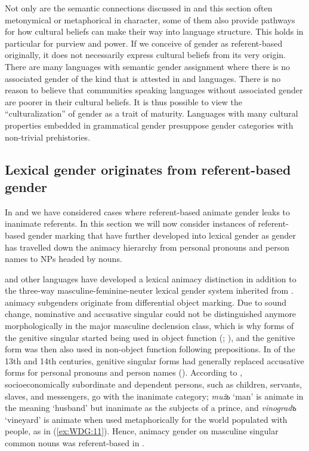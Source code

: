 \documentclass[output=collectionpaper]{langsci/langscibook}
\begin{document}
Not only are the semantic connections discussed in  and this section often metonymical or metaphorical in character, some of them also provide pathways for how cultural beliefs can make their way into language structure. This holds in particular for purview and power. If we conceive of gender as referent-based originally, it does not necessarily express cultural beliefs from its very origin. There are many languages with semantic gender assignment where there is no associated gender of the kind that is attested in  and  languages. There is no reason to believe that communities speaking languages without associated gender are poorer in their cultural beliefs. It is thus possible to view the ``culturalization'' of gender as a trait of maturity. Languages with many cultural properties embedded in grammatical gender presuppose gender categories with non-trivial prehistories.

  \subsection{Lexical gender originates from referent-based gender}
\label{sec:WDG:3.5}

In  and  we have considered cases where referent-based animate gender leaks to inanimate referents. In this section we will now consider instances of referent-based gender marking that have further developed into lexical gender as gender has travelled down the animacy hierarchy from personal pronouns and person names to NPs headed by nouns.


 and other  languages have developed a lexical animacy distinction in addition to the three-way masculine-feminine-neuter lexical gender system inherited from .  animacy subgenders originate from differential object marking. Due to sound change, nominative and accusative singular could not be distinguished anymore morphologically in the major masculine declension class, which is why forms of the genitive singular started being used in object function (\citealt{Meillet1897}; \citealt[206]{Huntley1980}), and the genitive form was then also used in non-object function following prepositions. In  of the 13th and 14th centuries, genitive singular forms had generally replaced accusative forms for personal pronouns and person names (\citealt[263]{Dietze1973}). According to \cite[265]{Dietze1973}, socioeconomically subordinate and dependent persons, such as children, servants, slaves, and messengers, go with the inanimate category; \textit{mužь} `man' is animate in the meaning `husband' but inanimate as the subjects of a prince, and \textit{vinogradъ} `vineyard' is animate when used metaphorically for the world populated with people, as in (\ref{ex:WDG:11}). Hence, animacy gender on masculine singular common nouns was referent-based in .
\end{document}
